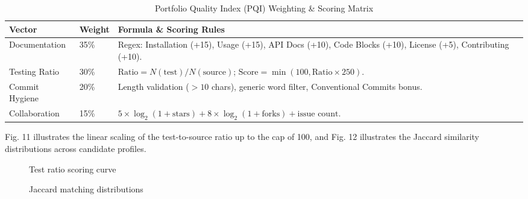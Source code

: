 \documentclass[12pt,a4paper]{article}
\begin{document}
\begin{table}[h!]
\centering
\caption{Portfolio Quality Index (PQI) Weighting \& Scoring Matrix}
\label{tab:pqi_matrix}
\small
\begin{tabularx}{\textwidth}{|p{3cm}|p{2cm}|X|}
\hline
\textbf{Vector} & \textbf{Weight} & \textbf{Formula \& Scoring Rules} \\ \hline
Documentation & 35\% & Regex: Installation (+15), Usage (+15), API Docs (+10), Code Blocks (+10), License (+5), Contributing (+10). \\ \hline
Testing Ratio & 30\% & $\text{Ratio} = N(\text{test})/N(\text{source})$; $\text{Score} = \min(100, \text{Ratio} \times 250)$. \\ \hline
Commit Hygiene & 20\% & Length validation ($>10$ chars), generic word filter, Conventional Commits bonus. \\ \hline
Collaboration & 15\% & $5 \times \log_2(1 + \text{stars}) + 8 \times \log_2(1 + \text{forks}) + \text{issue count}$. \\ \hline
\end{tabularx}
\end{table}

\noindent Fig. 11 illustrates the linear scaling of the test-to-source ratio up to the cap of 100, and Fig. 12 illustrates the Jaccard similarity distributions across candidate profiles.

\begin{figure}[h!]
\centering
\vspace{0.3cm}
\vspace{0.3cm}
\caption{Test ratio scoring curve}
\end{figure}

\newpage
\thispagestyle{fancy}
\begin{figure}[h!]
\centering
\vspace{0.3cm}
\vspace{0.3cm}
\caption{Jaccard matching distributions}
\end{figure}
\end{document}
